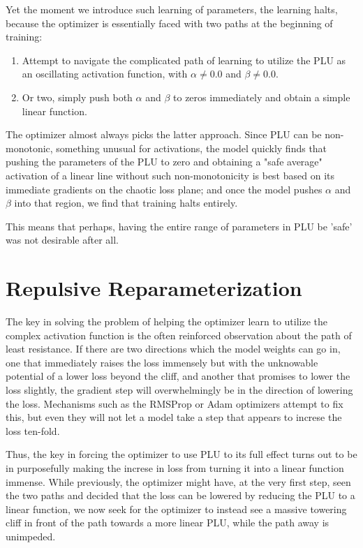 \documentclass[11pt, letterpaper]{article}
\begin{document}
Yet the moment we introduce such learning of parameters, the learning halts, because the optimizer is essentially faced with two paths at the beginning of training:
\begin{enumerate}
    \item Attempt to navigate the complicated path of learning to utilize the PLU as an oscillating activation function, with $\alpha \neq 0.0$ and $\beta \neq 0.0$.
    \item Or two, simply push both $\alpha$ and $\beta$ to zeros immediately and obtain a simple linear function.
\end{enumerate}
The optimizer almost always picks the latter approach. Since PLU can be non-monotonic, something unusual for activations, the model quickly finds that pushing the parameters of the PLU to zero and obtaining a "safe average" activation of a linear line without such non-monotonicity is best based on its immediate gradients on the chaotic loss plane; and once the model pushes $\alpha$ and $\beta$ into that region, we find that training halts entirely.

This means that perhaps, having the entire range of parameters in PLU be 'safe' was not desirable after all.

\section{Repulsive Reparameterization}

The key in solving the problem of helping the optimizer learn to utilize the complex activation function is the often reinforced observation about the path of least resistance. If there are two directions which the model weights can go in, one that immediately raises the loss immensely but with the unknowable potential of a lower loss beyond the cliff, and another that promises to lower the loss slightly, the gradient step will overwhelmingly be in the direction of lowering the loss. Mechanisms such as the RMSProp \cite{hintonetalrmsprop} or Adam \cite{kingma2017adammethodstochasticoptimization} optimizers attempt to fix this, but even they will not let a model take a step that appears to increse the loss ten-fold.

Thus, the key in forcing the optimizer to use PLU to its full effect turns out to be in purposefully making the increse in loss from turning it into a linear function immense. While previously, the optimizer might have, at the very first step, seen the two paths and decided that the loss can be lowered by reducing the PLU to a linear function, we now seek for the optimizer to instead see a massive towering cliff in front of the path towards a more linear PLU, while the path away is unimpeded.
\end{document}
